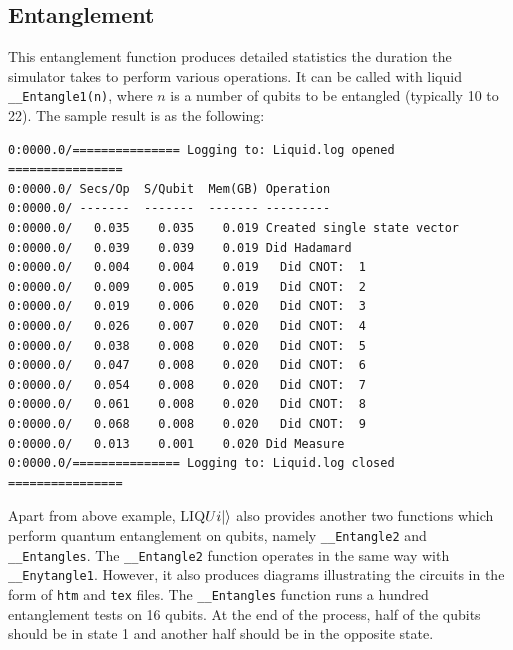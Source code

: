 \documentclass[12pt]{third-rep}
\begin{document}
\subsection{Entanglement}
This entanglement function produces detailed statistics the duration the simulator takes to perform various operations. It can be called with liquid \texttt{\_\_Entangle1(n)}, where $n$ is a number of qubits to be entangled (typically 10 to 22). The sample result is as the following:
\begin{verbatim}
0:0000.0/=============== Logging to: Liquid.log opened ================
0:0000.0/ Secs/Op  S/Qubit  Mem(GB) Operation
0:0000.0/ -------  -------  ------- ---------
0:0000.0/   0.035    0.035    0.019 Created single state vector
0:0000.0/   0.039    0.039    0.019 Did Hadamard
0:0000.0/   0.004    0.004    0.019   Did CNOT:  1
0:0000.0/   0.009    0.005    0.019   Did CNOT:  2
0:0000.0/   0.019    0.006    0.020   Did CNOT:  3
0:0000.0/   0.026    0.007    0.020   Did CNOT:  4
0:0000.0/   0.038    0.008    0.020   Did CNOT:  5
0:0000.0/   0.047    0.008    0.020   Did CNOT:  6
0:0000.0/   0.054    0.008    0.020   Did CNOT:  7
0:0000.0/   0.061    0.008    0.020   Did CNOT:  8
0:0000.0/   0.068    0.008    0.020   Did CNOT:  9
0:0000.0/   0.013    0.001    0.020 Did Measure
0:0000.0/=============== Logging to: Liquid.log closed ================
\end{verbatim}
Apart from above example, LIQ$Ui{\left\vert{}\right\rangle}$ also provides another two functions which perform quantum entanglement on qubits, namely \texttt{\_\_Entangle2} and \texttt{\_\_Entangles}. The \texttt{\_\_Entangle2} function operates in the same way with \texttt{\_\_Enytangle1}. However, it also produces diagrams illustrating the circuits in the form of \texttt{htm} and \texttt{tex} files. The \texttt{\_\_Entangles} function runs a hundred entanglement tests on 16 qubits. At the end of the process, half of the qubits should be in state 1 and another half should be in the opposite state.
\end{document}
